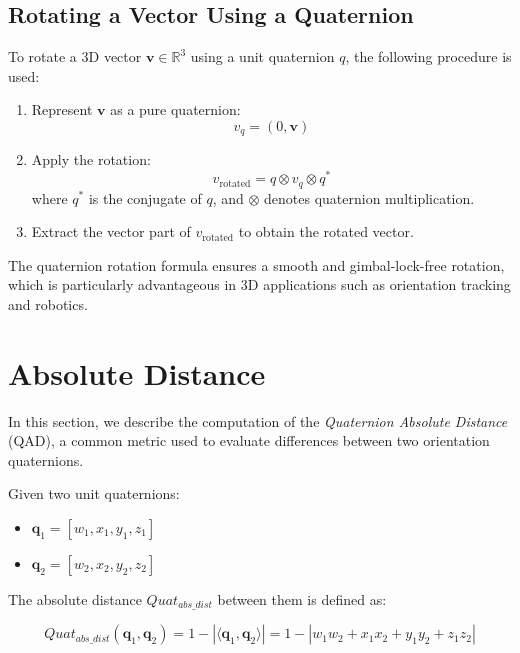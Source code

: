 \documentclass{iutbscthesis}
\begin{document}
\subsection{Rotating a Vector Using a Quaternion} \label{subsec:rotatevector}

To rotate a 3D vector $\mathbf{v} \in \mathbb{R}^3$ using a unit quaternion $q$, the following procedure is used:

\begin{enumerate}
    \item Represent $\mathbf{v}$ as a pure quaternion:
    \[
    v_q = (0, \mathbf{v})
    \]
    
    \item Apply the rotation:
    \[
    v_{\text{rotated}} = q \otimes v_q \otimes q^*
    \]
    where $q^*$ is the conjugate of $q$, and $\otimes$ denotes quaternion multiplication.
    
    \item Extract the vector part of $v_{\text{rotated}}$ to obtain the rotated vector.
\end{enumerate}

The quaternion rotation formula ensures a smooth and gimbal-lock-free rotation, which is particularly advantageous in 3D applications such as orientation tracking and robotics.


\section{Absolute Distance} \label{appendix:quaternion-distance}
In this section, we describe the computation of the \textit{Quaternion Absolute Distance} (QAD), a common metric used to evaluate differences between two orientation quaternions.

Given two unit quaternions:
\begin{itemize}
    \item $\mathbf{q}_1 = [w_1, x_1, y_1, z_1]$
    \item $\mathbf{q}_2 = [w_2, x_2, y_2, z_2]$
\end{itemize}

The absolute distance $Quat_{abs\_dist}$ between them is defined as:

\begin{equation}
    Quat_{abs\_dist}(\mathbf{q}_1, \mathbf{q}_2) = 1 - \left| \langle \mathbf{q}_1, \mathbf{q}_2 \rangle \right| = 1 - \left| w_1 w_2 + x_1 x_2 + y_1 y_2 + z_1 z_2 \right|
\end{equation}
\end{document}

